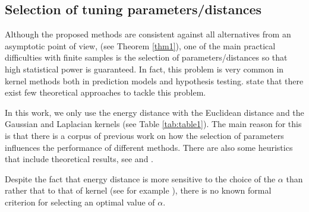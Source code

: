 \documentclass[11pt]{article}
\begin{document}
\subsection{Selection of tuning parameters/distances}\label{heuristic}


Although the proposed methods are consistent against all alternatives from an asymptotic point of view, (see  Theorem \ref{thm1}), one of the main practical difficulties with finite samples is the selection of parameters/distances so that high statistical power is guaranteed. In fact, this problem is very common in kernel methods both in prediction models and hypothesis testing.  \cite{filippi2016bayesian} state that there exist few theoretical approaches to tackle this problem.


In this work, we  only use the energy distance with the Euclidean distance and the Gaussian and Laplacian kernels (see Table \ref{tab:table1}). The main reason for this is that there is a corpus of previous work on how the selection of parameters influences  the performance of different methods. There are also  some heuristics that include  theoretical results, see  \cite{ramdas2015decreasing} and \cite{garreau2017large}.









Despite  the  fact that  energy  distance is more  sensitive to the choice of the $\alpha$ than rather that to that of kernel (see for example \cite{sejdinovic2013equivalence}), there is no known formal criterion for selecting an optimal value of $\alpha$.


\end{document}

